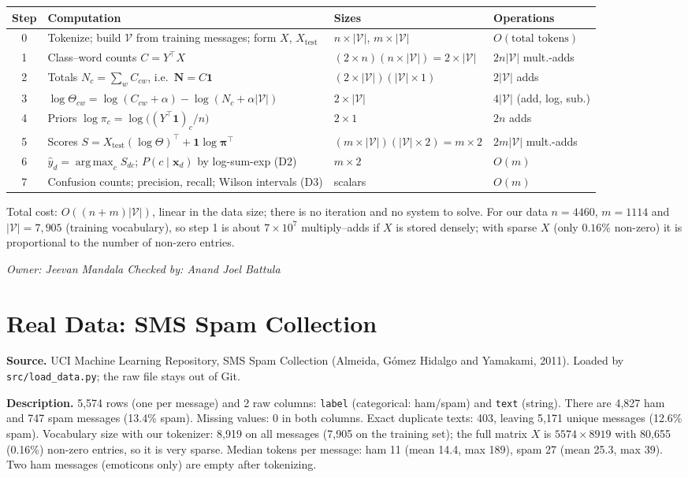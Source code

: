 \documentclass[11pt]{article}
\newcommand{\owner}[2]{\par\noindent\textit{Owner: #1 \hfill Checked by: #2}\par\medskip}
\theoremstyle{plain}
\theoremstyle{definition}
\newcommand{\V}{\mathcal{V}}
\newcommand{\Vs}{|\mathcal{V}|}
\newcommand{\bx}{\mathbf{x}}
\DeclareMathOperator*{\argmax}{arg\,max}
\begin{document}
\begin{center}
\small
\begin{tabularx}{\textwidth}{@{}c>{\raggedright\arraybackslash}X l l@{}}
\toprule
Step & Computation & Sizes & Operations\\
\midrule
0 & Tokenize; build $\V$ from training messages; form $X$, $X_{\text{test}}$ & $n\times\Vs$, $m\times\Vs$ & $O(\text{total tokens})$\\
1 & Class--word counts $C=Y^\top X$ & $(2\times n)(n\times\Vs)=2\times\Vs$ & $2n\Vs$ mult.-adds\\
2 & Totals $N_c=\sum_w C_{cw}$, i.e.\ $\mathbf N=C\mathbf 1$ & $(2\times\Vs)(\Vs\times1)$ & $2\Vs$ adds\\
3 & $\log\Theta_{cw}=\log(C_{cw}+\alpha)-\log(N_c+\alpha\Vs)$ & $2\times\Vs$ & $4\Vs$ (add, log, sub.)\\
4 & Priors $\log\pi_c=\log\big((Y^\top\mathbf 1)_c/n\big)$ & $2\times1$ & $2n$ adds\\
5 & Scores $S=X_{\text{test}}(\log\Theta)^\top+\mathbf 1\log\boldsymbol\pi^\top$ & $(m\times\Vs)(\Vs\times2)=m\times2$ & $2m\Vs$ mult.-adds\\
6 & $\hat y_d=\argmax_cS_{dc}$; $P(c\mid\bx_d)$ by log-sum-exp (D2) & $m\times2$ & $O(m)$\\
7 & Confusion counts; precision, recall; Wilson intervals (D3) & scalars & $O(m)$\\
\bottomrule
\end{tabularx}
\end{center}
Total cost: $O((n+m)\Vs)$, linear in the data size; there is no iteration and no system to solve.
For our data $n=4460$, $m=1114$ and $\Vs=7{,}905$ (training vocabulary), so step 1 is about $7\times10^{7}$ multiply--adds if $X$ is stored densely; with sparse $X$ (only $0.16\%$ non-zero) it is proportional to the number of non-zero entries.
\owner{Jeevan Mandala}{Anand Joel Battula}

\section{Real Data: SMS Spam Collection}\label{sec:data}
\textbf{Source.} UCI Machine Learning Repository, SMS Spam Collection (Almeida, G\'omez Hidalgo
and Yamakami, 2011). Loaded by \texttt{src/load\_data.py}; the raw file stays out of Git.

\textbf{Description.} 5,574 rows (one per message) and 2 raw columns: \texttt{label}
(categorical: ham/spam) and \texttt{text} (string). There are 4,827 ham and 747 spam messages
(13.4\% spam). Missing values: 0 in both columns. Exact duplicate texts:
403, leaving 5,171 unique messages (12.6\% spam). Vocabulary size with our tokenizer:
8,919 on all messages (7,905 on the training set); the full matrix $X$ is $5574\times8919$ with 80,655 (0.16\%) non-zero
entries, so it is very sparse. Median tokens per message: ham 11 (mean 14.4, max 189), spam 27 (mean 25.3, max 39). Two ham messages (emoticons only) are empty after tokenizing.
\end{document}
